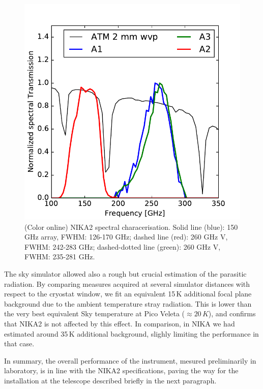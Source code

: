\documentclass[]{aa} %
\begin{document}
\begin{figure}[h]
   \centering
    \includegraphics[width=1.0\linewidth]{atm_transmission.pdf}
      \caption{(Color online) NIKA2 spectral characerisation. Solid line (blue): 150 GHz array, FWHM: 126-170 GHz; dashed line (red): 260 GHz V, FWHM: 242-283 GHz; dashed-dotted line (green): 260 GHz V, FWHM: 235-281 GHz.}
         \label{Fig4}
\end{figure}

The sky simulator allowed also a rough but crucial estimation of the parasitic radiation. By comparing measures acquired at several simulator distances with respect to the cryostat window, we fit an equivalent 15\,K additional focal plane background due to the ambient temperature stray radiation. This is lower than the very best equivalent Sky temperature at Pico Veleta ($\approx 20\,K$), and confirms that NIKA2 is not affected by this effect. In comparison, in NIKA we had estimated around 35\,K additional background, slighly limiting the performance in that case. 

In summary, the overall performance of the instrument, mesured preliminarily in laboratory, is in line with the NIKA2 specifications, paving the way for the installation at the telescope described briefly in the next paragraph. 
\end{document}
